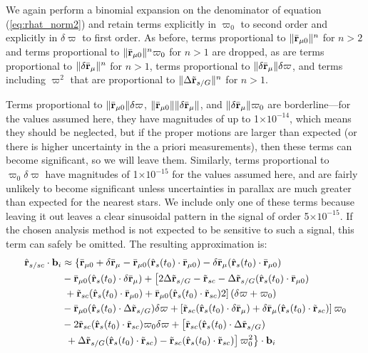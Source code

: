 We again perform a binomial expansion on the denominator of equation (\ref{eq:rhat_norm2}) and retain terms explicitly in $\varpi_0$ to second order and explicitly in $\delta\varpi$ to first order.   As before, terms proportional to $\Vert \bar{\mathbf{r}}_{\mu0} \Vert^n$ for $n > 2$ and terms proportional to $\Vert \bar{\mathbf{r}}_{\mu0} \Vert^n\varpi_0$ for $n > 1$ are dropped, as are terms proportional to  $\Vert \delta\bar{\mathbf{r}}_{\mu} \Vert^n$ for $n > 1$, terms proportional to $\Vert \delta\bar{\mathbf{r}}_{\mu} \Vert\delta\varpi$, and terms including $\varpi^2$ that are proportional to $\Vert\Delta \tilde{\mathbf{r}}_{s/G}\Vert^n$ for $n>1$.

Terms proportional to $\Vert \bar{\mathbf{r}}_{\mu0} \Vert \delta\varpi$, $\Vert \bar{\mathbf{r}}_{\mu0} \Vert\Vert \delta\bar{\mathbf{r}}_{\mu} \Vert$, and $\Vert \delta\bar{\mathbf{r}}_{\mu} \Vert\varpi_0$ are borderline---for the values assumed here, they have magnitudes of up to 1$\times10^{-14}$, which means they should be neglected, but if the proper motions are larger than expected (or there is higher uncertainty in the a priori measurements), then these terms can become significant, so we will leave them.  Similarly, terms proportional to $\varpi_0\delta\varpi$  have magnitudes of 1$\times10^{-15}$ for the values assumed here, and are fairly unlikely to become significant unless uncertainties in parallax are much greater than expected for the nearest stars.  We include only one of these terms because leaving it out leaves a clear sinusoidal pattern in the signal of order 5$\times10^{-15}$.  If the chosen analysis method is not expected to be sensitive to  such a signal, this term can safely be omitted.  The resulting approximation is:
\begin{equation} \label{eq:rhat_expand_apri}
\begin{split}
\hat{\mathbf{r}}_{s/sc} \cdot \mathbf b_i &\approx
\left\{\bar{\mathbf{r}}_{\mu0} + \delta\bar{\mathbf{r}}_\mu - \bar{\mathbf{r}}_{\mu0} (\hat{\mathbf{r}}_s(t_0) \cdot \bar{\mathbf{r}}_{\mu0}) - \delta\bar{\mathbf{r}}_\mu (\hat{\mathbf{r}}_s(t_0) \cdot \bar{\mathbf{r}}_{\mu0}) \right.\\
&{}- \bar{\mathbf{r}}_{\mu0} (\hat{\mathbf{r}}_s(t_0) \cdot \delta\bar{\mathbf{r}}_\mu) + \left[\vphantom{1}{2}\Delta \tilde{\mathbf{r}}_{s/G} - \tilde{\mathbf{r}}_{sc} - \Delta \tilde{\mathbf{r}}_{s/G} (\hat{\mathbf{r}}_s(t_0) \cdot \bar{\mathbf{r}}_{\mu0})\right. \\
&\left.{}+ \tilde{\mathbf{r}}_{sc} (\hat{\mathbf{r}}_s(t_0) \cdot \bar{\mathbf{r}}_{\mu0}) + \bar{\mathbf{r}}_{\mu0} (\hat{\mathbf{r}}_s(t_0) \cdot \tilde{\mathbf{r}}_{sc})\vphantom{1}{2}\right] \left(\delta\varpi +\varpi_0\right)\\
&{} - \bar{\mathbf{r}}_{\mu0} (\hat{\mathbf{r}}_s(t_0) \cdot \Delta \tilde{\mathbf{r}}_{s/G})\delta\varpi + \left[ \tilde{\mathbf{r}}_{sc} (\hat{\mathbf{r}}_s(t_0) \cdot \delta\bar{\mathbf{r}}_\mu) + \delta\bar{\mathbf{r}}_\mu (\hat{\mathbf{r}}_s(t_0) \cdot \tilde{\mathbf{r}}_{sc})\right] \varpi_0\\
&{}  -2\tilde{\mathbf{r}}_{sc} (\hat{\mathbf{r}}_s(t_0) \cdot \tilde{\mathbf{r}}_{sc})\varpi_0 \delta\varpi + \left[\tilde{\mathbf{r}}_{sc} (\hat{\mathbf{r}}_s(t_0) \cdot \Delta \tilde{\mathbf{r}}_{s/G})\right.\\
&\left.\left.{}  + \Delta \tilde{\mathbf{r}}_{s/G} (\hat{\mathbf{r}}_s(t_0) \cdot \tilde{\mathbf{r}}_{sc}) - \tilde{\mathbf{r}}_{sc} (\hat{\mathbf{r}}_s(t_0) \cdot \tilde{\mathbf{r}}_{sc})\right] \varpi_0^2\right\}\cdot \mathbf b_i
\end{split}
\end{equation}

